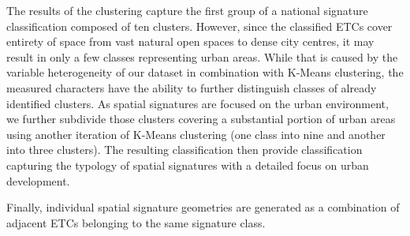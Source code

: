 The results of the clustering capture the first group of a national signature
classification composed of ten clusters. However, since the classified ETCs cover entirety of space from vast
natural open spaces to dense city centres, it may result in only a few classes
representing urban areas. While that is caused by the variable heterogeneity of our
dataset in combination with K-Means clustering, the measured characters have the ability
to further distinguish classes of already identified clusters. As spatial signatures
are focused on the urban environment, we further subdivide those clusters covering
a substantial portion of urban areas using another iteration of K-Means clustering
(one class into nine and another into three clusters).
The resulting classification then provide classification capturing the typology of
spatial signatures with a detailed focus on urban development.


Finally, individual spatial signature geometries are generated as a combination of
adjacent ETCs belonging to the same signature class.

